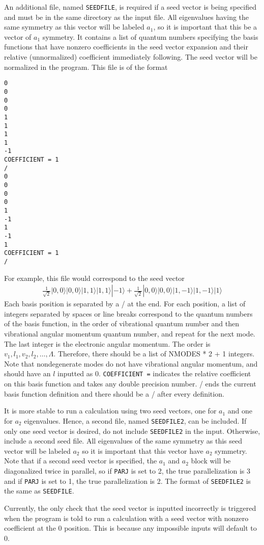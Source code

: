 \documentclass{article}
\begin{document}
An additional file, named {\tt SEEDFILE}, is required if a seed vector is being specified and must be in the same directory as the input file. All eigenvalues having the same symmetry as this vector will be labeled $a_1$, so it is important that this be a vector of $a_1$ symmetry. It contains a list of quantum numbers specifying the basis functions that have nonzero coefficients in the seed vector expansion and their relative (unnormalized) coefficient immediately following. The seed vector will be normalized in the program.
This file is of the format 
\begin{verbatim}
0
0
0
0
1
1
1
1
-1
COEFFICIENT = 1
/
0
0
0
0
1
-1
1
-1
1
COEFFICIENT = 1
/
\end{verbatim}
For example, this file would correspond to the seed vector
\begin{align*}
	\frac{1}{\sqrt{2}}|0,0\rangle |0,0\rangle |1,1\rangle |1,1 \rangle |-1\rangle + 
	\frac{1}{\sqrt{2}}|0,0\rangle |0,0\rangle |1,-1\rangle |1,-1 \rangle |1\rangle
\end{align*}
Each basis position is separated by a / at the end. For each position, a list of integers separated by spaces or line breaks correspond to the quantum numbers of the basis function, in the order of vibrational quantum number and then vibrational angular momentum quantum number, and repeat for the next mode. The last integer is the electronic angular momentum. The order is $v_1, l_1, v_2, l_2, \ldots, \Lambda$. Therefore, there should be a list of NMODES * 2 + 1 integers. Note that nondegenerate modes do not have vibrational angular momentum, and should have an $l$ inputted as 0. \texttt{COEFFICIENT =} indicates the relative coefficient on this basis function and takes any double precision number. / ends the current basis function definition and there should be a / after every definition.

It is more stable to run a calculation using two seed vectors, one for $a_1$ and one for $a_2$ eigenvalues. Hence, a second file, named \texttt{SEEDFILE2}, can be included. If only one seed vector is desired, do not include \texttt{SEEDFILE2} in the input. Otherwise, include a second seed file. All eigenvalues of the same symmetry as this seed vector will be labeled $a_2$ so it is important that this vector have $a_2$ symmetry. Note that if a second seed vector is specified, the $a_1$ and $a_2$ block will be diagonalized twice in parallel, so if \texttt{PARJ} is set to 2, the true parallelization is 3 and if \texttt{PARJ} is set to 1, the true parallelization is 2. The format of \texttt{SEEDFILE2} is the same as \texttt{SEEDFILE}.

Currently, the only check that the seed vector is inputted incorrectly is triggered when the program is told to run a calculation with a seed vector with nonzero coefficient at the 0 position. This is because any impossible inputs will default to 0.


\end{document}
